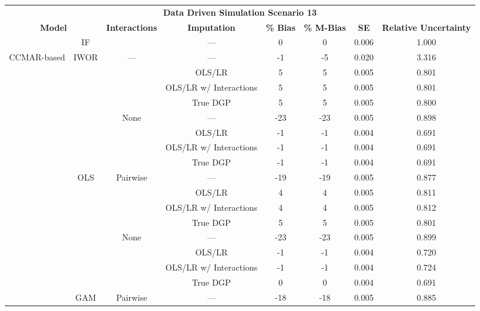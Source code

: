 \begin{table}
\centering
\begin{tabular}[ht]{|>{}c|c|c|c|c|c|c|>{}c|}
\hline
\multicolumn{8}{|c|}{\textbf{Data Driven Simulation Scenario 13}} \\
\cline{1-8}
\multicolumn{2}{|c|}{\textbf{Model}} & \textbf{Interactions} & \textbf{Imputation} & \textbf{\% Bias} & \textbf{\% M-Bias} & \textbf{SE} & \textbf{Relative Uncertainty}\\
\hline
 & IF &  & --- & 0 & 0 & 0.006 & 1.000\\
\cline{2-2}
\cline{4-8}
\multirow{-2}{*}{\centering\arraybackslash CCMAR-based} & IWOR & \multirow{-2}{*}{\centering\arraybackslash ---} & --- & -1 & -5 & 0.020 & 3.316\\
\cline{1-8}
 &  &  & OLS/LR & 5 & 5 & 0.005 & 0.801\\
\cline{4-8}
 &  &  & OLS/LR w/ Interactions & 5 & 5 & 0.005 & 0.801\\
\cline{4-8}
 &  &  & True DGP & 5 & 5 & 0.005 & 0.800\\
\cline{4-8}
 &  & \multirow{-4}{*}{\centering\arraybackslash None} & --- & -23 & -23 & 0.005 & 0.898\\
\cline{3-8}
 &  &  & OLS/LR & -1 & -1 & 0.004 & 0.691\\
\cline{4-8}
 &  &  & OLS/LR w/ Interactions & -1 & -1 & 0.004 & 0.691\\
\cline{4-8}
 &  &  & True DGP & -1 & -1 & 0.004 & 0.691\\
\cline{4-8}
 & \multirow{-8}{*}{\centering\arraybackslash OLS} & \multirow{-4}{*}{\centering\arraybackslash Pairwise} & --- & -19 & -19 & 0.005 & 0.877\\
\cline{2-8}
 &  &  & OLS/LR & 4 & 4 & 0.005 & 0.811\\
\cline{4-8}
 &  &  & OLS/LR w/ Interactions & 4 & 4 & 0.005 & 0.812\\
\cline{4-8}
 &  &  & True DGP & 5 & 5 & 0.005 & 0.801\\
\cline{4-8}
 &  & \multirow{-4}{*}{\centering\arraybackslash None} & --- & -23 & -23 & 0.005 & 0.899\\
\cline{3-8}
 &  &  & OLS/LR & -1 & -1 & 0.004 & 0.720\\
\cline{4-8}
 &  &  & OLS/LR w/ Interactions & -1 & -1 & 0.004 & 0.724\\
\cline{4-8}
 &  &  & True DGP & 0 & 0 & 0.004 & 0.691\\
\cline{4-8}
 & \multirow{-8}{*}{\centering\arraybackslash GAM} & \multirow{-4}{*}{\centering\arraybackslash Pairwise} & --- & -18 & -18 & 0.005 & 0.885\\

\end{tabular}
\end{table}
